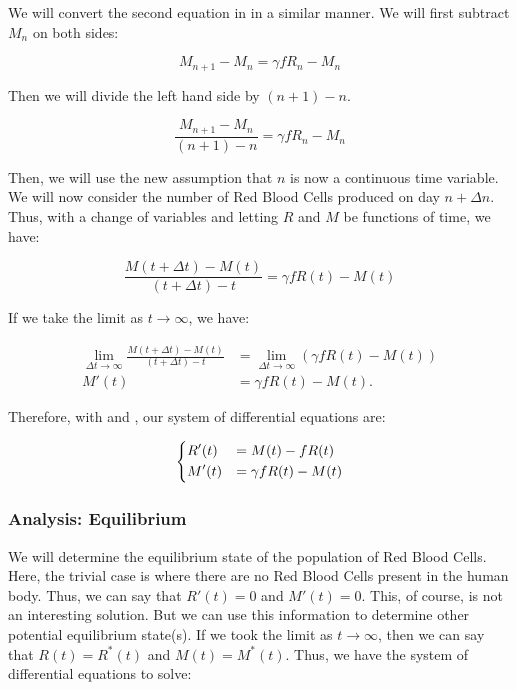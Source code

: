 We will convert the second equation in  in a similar manner. We will first subtract $M_n$ on both sides:

\begin{equation*}
    M_{n+1} - M_n = \gamma fR_n - M_n
\end{equation*}

Then we will divide the left hand side by $(n+1)-n$.

\begin{equation*}
    \frac{M_{n+1} - M_n}{(n+1)-n} = \gamma fR_n - M_n
\end{equation*}

Then, we will use the new assumption that $n$ is now a continuous time variable. We will now consider the number of Red Blood Cells produced on day $n+\Delta n$. Thus, with a change of variables and letting $R$ and $M$ be functions of time, we have:

\begin{equation*}
    \frac{M(t+\Delta t) - M(t)}{(t+\Delta t)-t} = \gamma fR(t) - M(t)
\end{equation*}

If we take the limit as $t\to\infty$, we have:

\begin{align} 
    \lim_{\Delta t \to\infty}\frac{M(t+\Delta t) - M(t)}{(t+\Delta t)-t} &= \lim_{\Delta t \to\infty} (\gamma fR(t) - M(t)) \nonumber\\
    M'(t) &= \gamma fR(t) - M(t).\label{eq:linear-differential-equation-M}
\end{align}

Therefore, with  and , our system of differential equations are:

\begin{equation}
    \begin{dcases}
        R'(t) &= M(t) - fR(t)\\
        M'(t) &= \gamma fR(t) - M(t)
    \end{dcases}
    \label{eq:linear-differential-model-system}
\end{equation}

\subsubsection{Analysis: Equilibrium}

We will determine the equilibrium state of the population of Red Blood Cells. Here, the trivial case is where there are no Red Blood Cells present in the human body. Thus, we can say that $R'(t) = 0$ and $M'(t) = 0$. This, of course, is not an interesting solution. But we can use this information to determine other potential equilibrium state(s). If we took the limit as $t\to\infty$, then we can say that $R(t) = R^\ast(t)$ and $M(t) = M^\ast(t)$. Thus, we have the system of differential equations to solve:

